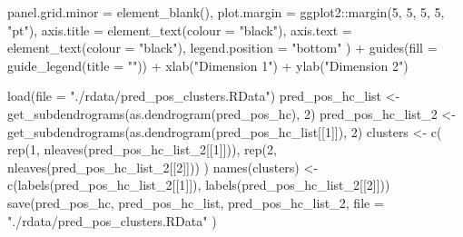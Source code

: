 \documentclass[
  11pt,
  oneside]{book}
\newenvironment{Shaded}{\begin{snugshade}}{\end{snugshade}}
\newcommand{\AttributeTok}[1]{\textcolor[rgb]{0.77,0.63,0.00}{#1}}
\newcommand{\DecValTok}[1]{\textcolor[rgb]{0.00,0.00,0.81}{#1}}
\newcommand{\FunctionTok}[1]{\textcolor[rgb]{0.00,0.00,0.00}{#1}}
\newcommand{\NormalTok}[1]{#1}
\newcommand{\OtherTok}[1]{\textcolor[rgb]{0.56,0.35,0.01}{#1}}
\newcommand{\SpecialCharTok}[1]{\textcolor[rgb]{0.00,0.00,0.00}{#1}}
\newcommand{\StringTok}[1]{\textcolor[rgb]{0.31,0.60,0.02}{#1}}
\begin{document}
\begin{Shaded}
\begin{Highlighting}[]
    \AttributeTok{panel.grid.minor =} \FunctionTok{element\_blank}\NormalTok{(),}
    \AttributeTok{plot.margin =}\NormalTok{ ggplot2}\SpecialCharTok{::}\FunctionTok{margin}\NormalTok{(}\DecValTok{5}\NormalTok{, }\DecValTok{5}\NormalTok{, }\DecValTok{5}\NormalTok{, }\DecValTok{5}\NormalTok{, }\StringTok{"pt"}\NormalTok{),}
    \AttributeTok{axis.title =} \FunctionTok{element\_text}\NormalTok{(}\AttributeTok{colour =} \StringTok{"black"}\NormalTok{),}
    \AttributeTok{axis.text =} \FunctionTok{element\_text}\NormalTok{(}\AttributeTok{colour =} \StringTok{"black"}\NormalTok{),}
    \AttributeTok{legend.position =} \StringTok{"bottom"}
\NormalTok{  ) }\SpecialCharTok{+}
  \FunctionTok{guides}\NormalTok{(}\AttributeTok{fill =} \FunctionTok{guide\_legend}\NormalTok{(}\AttributeTok{title =} \StringTok{""}\NormalTok{)) }\SpecialCharTok{+}
  \FunctionTok{xlab}\NormalTok{(}\StringTok{"Dimension 1"}\NormalTok{) }\SpecialCharTok{+}
  \FunctionTok{ylab}\NormalTok{(}\StringTok{"Dimension 2"}\NormalTok{)}
\end{Highlighting}
\end{Shaded}

\begin{Shaded}
\begin{Highlighting}[]
\FunctionTok{load}\NormalTok{(}\AttributeTok{file =} \StringTok{"./rdata/pred\_pos\_clusters.RData"}\NormalTok{)}
\NormalTok{pred\_pos\_hc\_list }\OtherTok{\textless{}{-}} \FunctionTok{get\_subdendrograms}\NormalTok{(}\FunctionTok{as.dendrogram}\NormalTok{(pred\_pos\_hc), }\DecValTok{2}\NormalTok{)}
\NormalTok{pred\_pos\_hc\_list\_2 }\OtherTok{\textless{}{-}} \FunctionTok{get\_subdendrograms}\NormalTok{(}\FunctionTok{as.dendrogram}\NormalTok{(pred\_pos\_hc\_list[[}\DecValTok{1}\NormalTok{]]), }\DecValTok{2}\NormalTok{)}
\NormalTok{clusters }\OtherTok{\textless{}{-}} \FunctionTok{c}\NormalTok{(}
  \FunctionTok{rep}\NormalTok{(}\DecValTok{1}\NormalTok{, }\FunctionTok{nleaves}\NormalTok{(pred\_pos\_hc\_list\_2[[}\DecValTok{1}\NormalTok{]])),}
  \FunctionTok{rep}\NormalTok{(}\DecValTok{2}\NormalTok{, }\FunctionTok{nleaves}\NormalTok{(pred\_pos\_hc\_list\_2[[}\DecValTok{2}\NormalTok{]]))}
\NormalTok{)}
\FunctionTok{names}\NormalTok{(clusters) }\OtherTok{\textless{}{-}} \FunctionTok{c}\NormalTok{(}\FunctionTok{labels}\NormalTok{(pred\_pos\_hc\_list\_2[[}\DecValTok{1}\NormalTok{]]), }\FunctionTok{labels}\NormalTok{(pred\_pos\_hc\_list\_2[[}\DecValTok{2}\NormalTok{]]))}
\FunctionTok{save}\NormalTok{(pred\_pos\_hc, pred\_pos\_hc\_list, pred\_pos\_hc\_list\_2,}
  \AttributeTok{file =} \StringTok{"./rdata/pred\_pos\_clusters.RData"}
\NormalTok{)}
\end{Highlighting}
\end{Shaded}
\end{document}
